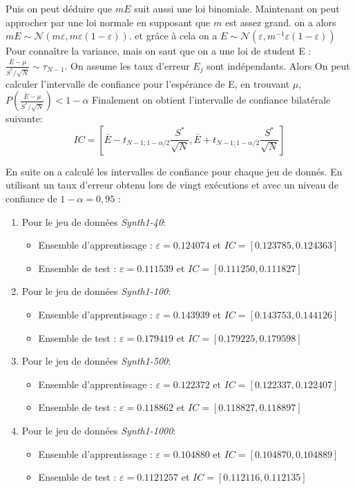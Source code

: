 \documentclass[a4paper,11pt]{article}
\begin{document}
Puis on peut déduire que $mE$ suit aussi une loi binomiale. Maintenant on peut approcher par une loi normale en supposant que $m$ est assez grand. on a alors $mE\sim \mathcal{N}(m\varepsilon,m\varepsilon(1-\varepsilon))$.
et grâce à cela on a $E\sim \mathcal{N}(\varepsilon,m^{-1}\varepsilon(1-\varepsilon))$
Pour connaître la variance, mais on saut que on a une loi de student E : $\frac{\bar{E}-\mu}{S^*/\sqrt{N}} \sim \tau_{N-1}$. On assume les taux d'erreur $E_j$ sont indépendants. Alors On peut calculer l'intervalle de confiance pour l'espérance de E, en trouvant $\mu$,  $P(\frac{\bar{E}-\mu}{S^*/\sqrt{N}}) < 1-\alpha$
Finalement on obtient l’intervalle de confiance bilatérale suivante:
\[IC = [\bar{E} - t_{N-1;1-\alpha/2}\frac{S^*}{\sqrt{N}}, \bar{E} + t_{N-1;1-\alpha/2}\frac{S^*}{\sqrt{N}}]\]

En suite on a calculé les intervalles de confiance pour chaque jeu de donnés. En utilisant un taux d'erreur obtenu lors de vingt exécutions et avec un niveau de confiance de $1 - \alpha = 0,95$ : 
\begin{enumerate}
  \item Pour le jeu de données \textit{Synth1-40}:
  \begin{itemize}
    \item Ensemble d’apprentissage :  $\varepsilon = 0.124074$ et $IC = [0.123785,0.124363]$
    \item Ensemble de test :  $\varepsilon = 0.111539$ et $IC = [0.111250,0.111827]$
  \end{itemize}
  \item Pour le jeu de données \textit{Synth1-100}:
  \begin{itemize}
    \item Ensemble d’apprentissage :  $\varepsilon = 0.143939$ et $IC = [0.143753,0.144126]$
    \item Ensemble de test :  $\varepsilon = 0.179419$ et $IC = [0.179225,0.179598]$
  \end{itemize}
  \item Pour le jeu de données \textit{Synth1-500}:
  \begin{itemize}
    \item Ensemble d’apprentissage :  $\varepsilon = 0.122372$ et $IC = [0.122337,0.122407]$
    \item Ensemble de test :  $\varepsilon = 0.118862$ et $IC = [0.118827,0.118897]$
  \end{itemize}
  \item Pour le jeu de données \textit{Synth1-1000}:
  \begin{itemize}
    \item Ensemble d’apprentissage :  $\varepsilon = 0.104880$ et $IC = [0.104870,0.104889]$
    \item Ensemble de test :  $\varepsilon = 0.1121257$ et $IC = [0.112116,0.112135]$
  \end{itemize}
\end{enumerate}
\end{document}
